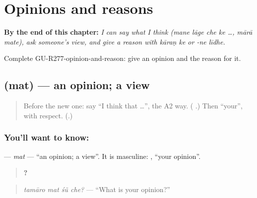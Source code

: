 
\chapter{Opinions and reasons}
\label{ch:gu-opinions-and-reasons}

\begin{chapteropening}
\textbf{By the end of this chapter:} \emph{I can say what I think (mane lāge che ke …, mārā mate), ask someone's view, and give a reason with kāraṇ ke or -ne līdhe.}

Complete GU-R277-opinion-and-reason: give an opinion and the reason for it.
\end{chapteropening}

\section[\texorpdfstring{\gu{મત} (mat)}{મત (mat)}]{ (mat) — an opinion; a view}

\label{lesson:GU-C277-mat}



\begin{quote}
Before the new one: say \textquotedblleft{}I think that …\textquotedblright{}, the A2 way. (\textbf{  }.) Then \textquotedblleft{}your\textquotedblright{}, with respect. (\textbf{}.)
\end{quote}

\subsection*{You'll want to know: }
\textbf{} — \emph{mat} — \textquotedblleft{}an opinion; a view\textquotedblright{}. It is masculine: \textbf{ }, \textquotedblleft{}your opinion\textquotedblright{}.

\begin{quote}
\textbf{   ?}
\end{quote}

\begin{quote}
\emph{tamāro mat śũ che?} — \textquotedblleft{}What is your opinion?\textquotedblright{}
\end{quote}

